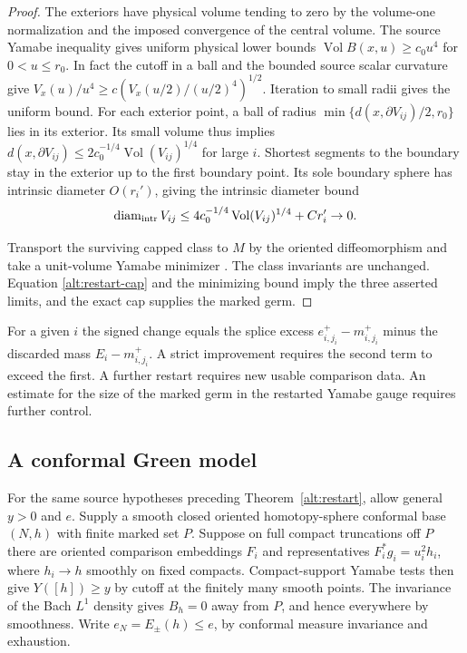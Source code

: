\begin{proof}
The exteriors have physical volume tending to zero by the
volume-one normalization and the imposed convergence of the
central volume. The source Yamabe inequality gives uniform
physical lower bounds \(\operatorname{Vol} B(x,u)\ge c_0u^4\)
for \(0<u\le r_0\). In fact the cutoff in a ball and the
bounded source scalar curvature give \(V_x(u)/u^4\ge
c(V_x(u/2)/(u/2)^4)^{1/2}\). Iteration to small radii gives
the uniform bound. For each exterior point, a ball of radius
\(\min\{d(x,\partial V_{ij})/2,r_0\}\) lies in its exterior.
Its small volume thus implies
\(d(x,\partial V_{ij})\le 2c_0^{-1/4}
\operatorname{Vol}(V_{ij})^{1/4}\) for large \(i\).
Shortest segments to the boundary stay in the exterior up to the
first boundary point. Its sole boundary sphere has intrinsic
diameter \(O(r_i')\), giving the intrinsic diameter bound
\[
 \operatorname{diam}_{\rm intr} V_{ij}
 \le 4c_0^{-1/4}\operatorname{Vol}(V_{ij})^{1/4}+Cr_i'\to0 .
\]

Transport the surviving capped class to \(M\) by the oriented
diffeomorphism and take a unit-volume Yamabe minimizer
\cite[\S3]{Schoen1984Yamabe}. The class invariants are unchanged.
Equation \eqref{alt:restart-cap} and the minimizing bound imply the
three asserted limits, and the exact cap supplies the marked germ.
\end{proof}

For a given \(i\) the signed change equals the splice excess
\(e^+_{i,j_i}-m^+_{i,j_i}\) minus the discarded mass
\(E_i-m^+_{i,j_i}\). A strict improvement requires the second
term to exceed the first. A further restart requires new usable
comparison data. An estimate for the size of the marked germ
in the restarted Yamabe gauge requires further control.

\subsection{A conformal Green model}

For the same source hypotheses preceding
Theorem~\ref{alt:restart}, allow general \(y>0\) and \(e\).
Supply a smooth closed oriented homotopy-sphere conformal base
\((N,h)\) with finite marked set \(P\). Suppose on full compact
truncations off \(P\) there are oriented comparison embeddings
\(F_i\) and representatives \(F_i^*g_i=u_i^2h_i\), where
\(h_i\to h\) smoothly on fixed compacts. Compact-support Yamabe
tests then give \(Y([h])\ge y\) by cutoff at the finitely many
smooth points. The invariance of the Bach \(L^1\) density gives
\(B_h=0\) away from \(P\), and hence everywhere by smoothness.
Write \(e_N=E_\pm(h)\le e\), by conformal measure invariance
and exhaustion.

